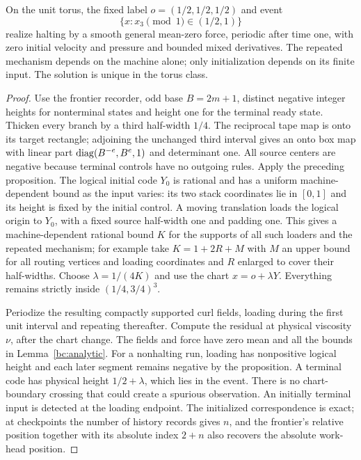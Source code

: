 \begin{theorem}\label{bc:expanded-height-event}
On the unit torus, the fixed label $o=(1/2,1/2,1/2)$ and event
\begin{equation}\label{bc:expanded-height-fixed-event}
 \{x:x_3\pmod1\in(1/2,1)\}
\end{equation}
realize halting by a smooth general mean-zero force, periodic after time
one, with zero initial velocity and pressure and bounded mixed derivatives.
The repeated mechanism depends on the machine alone; only initialization
depends on its finite input. The solution is unique in the torus class.
\end{theorem}
\begin{proof}\label{bc:expanded-height-event-proof}
Use the frontier recorder, odd base $B=2m+1$, distinct negative integer
heights for nonterminal states and height one for the terminal ready state.
Thicken every branch by a third half-width $1/4$. The reciprocal tape
map is onto its target rectangle; adjoining the unchanged third interval
gives an onto box map with linear part $\operatorname{diag}(B^{-e},B^e,1)$ and
determinant one. All source centers are
negative because terminal controls have no outgoing rules. Apply the
preceding proposition. The logical initial code $Y_0$ is rational and has
a uniform machine-dependent bound as the input varies: its two stack
coordinates lie in $[0,1]$ and its height is fixed by the initial control.
A moving translation loads the logical origin to $Y_0$, with a fixed
source half-width one and padding one. This gives a machine-dependent
rational bound $K$ for the supports of all such loaders and the repeated
mechanism; for example take $K=1+2R+M$ with $M$ an upper bound for all
routing vertices and loading coordinates and $R$ enlarged to cover their
half-widths. Choose $\lambda=1/(4K)$ and use the chart $x=o+\lambda Y$.
Everything remains strictly inside $(1/4,3/4)^3$.

Periodize the resulting compactly supported curl fields, loading during
the first unit interval and repeating thereafter. Compute the residual
at physical viscosity $\nu$, after the chart change. The fields and force
have zero mean and all the bounds in Lemma~\ref{bc:analytic}.
For a nonhalting run, loading has nonpositive logical height and each
later segment remains negative by the proposition. A terminal code has
physical height $1/2+\lambda$, which lies in the event. There is no
chart-boundary crossing that could create a spurious observation.
An initially terminal input is detected at the loading endpoint.
The initialized correspondence is exact; at checkpoints the number of
history records gives $n$, and the frontier's relative position together
with its absolute index $2+n$ also recovers the absolute work-head position.
\end{proof}

